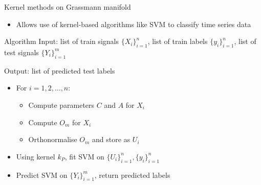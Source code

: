 \documentclass[final]{beamer}
\newlength{\onecolwid}
\begin{document}
\begin{frame}[t]
\begin{columns}[t]
\begin{column}{\onecolwid}
\begin{block}{Kernel methods on Grassmann manifold}
\begin{itemize}
            \begin{equation}
                d_P([Y_1], [Y_2]) = 2^{-1/2} \norm{Y_1Y_1^T - Y_2Y_2^T}_F
            \end{equation}
            \begin{equation}\label{eq:kernel}
                k_P([Y_1, Y_2]) = \exp(-\gamma d_P^2([Y_1], [Y_2]))
            \end{equation}

            where $[Y_i]$ is the subspace spanned by the columns of $Y_i$, $Y_1$ and $Y_2$ are
            matrices with orthonormal columns, and $\gamma$ is a hyperparameter
        
        \item Allows use of kernel-based algorithms like SVM to classify time series data
    \end{itemize}
\end{block}


\begin{block}{Algorithm}
    Input: list of train signals $\{X_i\}_{i=1}^n$, list of train labels $\{y_i\}_{i=1}^n$, list of
    test signals $\{Y_i\}_{i=1}^m$

    Output: list of predicted test labels
    \begin{itemize}
        \item For $i = 1, 2, \dots, n$:

            \begin{itemize}
                \item Compute parameters $C$ and $A$ for $X_i$
                \item Compute $O_m$ for $X_i$
                \item Orthonormalise $O_m$ and store as $U_i$
            \end{itemize}

        \item Using kernel $k_P$, fit SVM on $\{U_i\}_{i=1}^n, \{y_i\}_{i=1}^n$

        \item Predict SVM on $\{Y_i\}_{i=1}^m$, return predicted labels
    \end{itemize}
\end{block}



\end{column}
\end{columns}
\end{frame}
\end{document}
